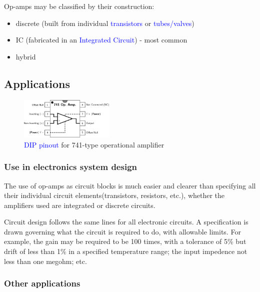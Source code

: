 \documentclass[11pt,a4paper,oneside]{article}
\begin{document}
	Op-amps may be classified by their construction:

	\begin{itemize}
		\item discrete (built from individual \textcolor{blue}{transistors} or \textcolor{blue}{tubes/valves})
		\item IC (fabricated in an \textcolor{blue}{Integrated Circuit}) - most common
		\item hybrid
	\end{itemize}

	\subsection{Applications}

	\begin{figure}[hbt!]
		\centering
		\includegraphics[width=0.4\textwidth]{images/741-type operational amplifier.png}
		\caption{\textcolor{blue}{DIP pinout} for 741-type operational amplifier}
	\end{figure}

	\subsubsection{Use in electronics system design}

	The use of op-amps as circuit blocks is much easier and clearer than specifying all their individual circuit elements(transistors, resistors, etc.), whether the amplifiers used are integrated or discrete circuits.

	Circuit design follows the same lines for all electronic circuits. A specification is drawn governing what the circuit is required to do, with allowable limits. For example, the gain may be required to be 100 times, with a tolerance of 5\% but drift of less than 1\% in a specified temperature range; the input impedence not less than one megohm; etc.

	\subsubsection{Other applications}
\end{document}
